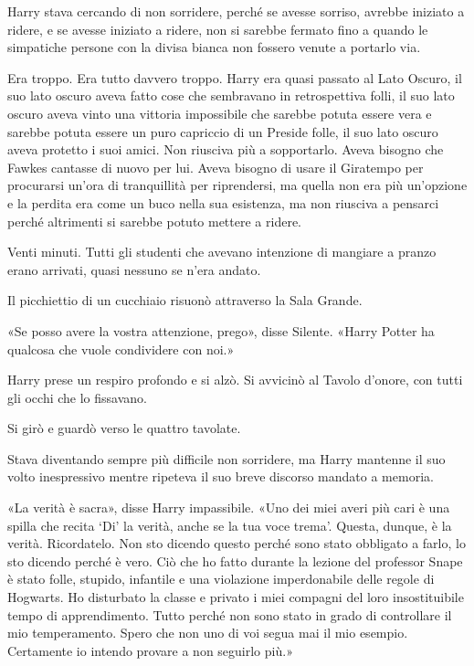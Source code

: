 Harry stava cercando di non sorridere, perché se avesse sorriso, avrebbe iniziato a ridere, e se avesse iniziato a ridere, non si sarebbe fermato fino a quando le simpatiche persone con la divisa bianca non fossero venute a portarlo via.

Era troppo. Era tutto davvero troppo. Harry era quasi passato al Lato Oscuro, il suo lato oscuro aveva fatto cose che sembravano in retrospettiva folli, il suo lato oscuro aveva vinto una vittoria impossibile che sarebbe potuta essere vera e sarebbe potuta essere un puro capriccio di un Preside folle, il suo lato oscuro aveva protetto i suoi amici. Non riusciva più a sopportarlo. Aveva bisogno che Fawkes cantasse di nuovo per lui. Aveva bisogno di usare il Giratempo per procurarsi un’ora di tranquillità per riprendersi, ma quella non era più un’opzione e la perdita era come un buco nella sua esistenza, ma non riusciva a pensarci perché altrimenti si sarebbe potuto mettere a ridere.

Venti minuti. Tutti gli studenti che avevano intenzione di mangiare a pranzo erano arrivati, quasi nessuno se n’era andato.

Il picchiettio di un cucchiaio risuonò attraverso la Sala Grande.

«Se posso avere la vostra attenzione, prego», disse Silente. «Harry Potter ha qualcosa che vuole condividere con noi.»

Harry prese un respiro profondo e si alzò. Si avvicinò al Tavolo d’onore, con tutti gli occhi che lo fissavano.

Si girò e guardò verso le quattro tavolate.

Stava diventando sempre più difficile non sorridere, ma Harry mantenne il suo volto inespressivo mentre ripeteva il suo breve discorso mandato a memoria.

«La verità è sacra», disse Harry impassibile. «Uno dei miei averi più cari è una spilla che recita ‘Di’ la verità, anche se la tua voce trema’. Questa, dunque, è la verità. Ricordatelo. Non sto dicendo questo perché sono stato obbligato a farlo, lo sto dicendo perché è vero. Ciò che ho fatto durante la lezione del professor Snape è stato folle, stupido, infantile e una violazione imperdonabile delle regole di Hogwarts. Ho disturbato la classe e privato i miei compagni del loro insostituibile tempo di apprendimento. Tutto perché non sono stato in grado di controllare il mio temperamento. Spero che non uno di voi segua mai il mio esempio. Certamente io intendo provare a non seguirlo più.»

